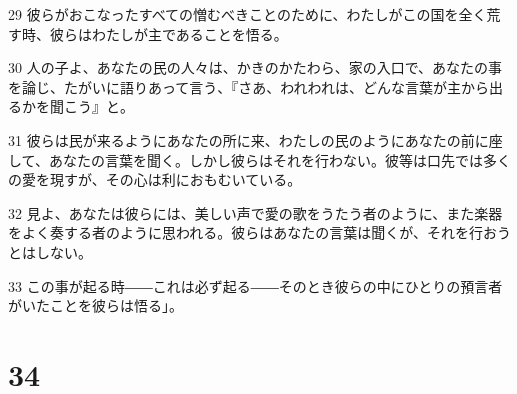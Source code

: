 \par 29 彼らがおこなったすべての憎むべきことのために、わたしがこの国を全く荒す時、彼らはわたしが主であることを悟る。
\par 30 人の子よ、あなたの民の人々は、かきのかたわら、家の入口で、あなたの事を論じ、たがいに語りあって言う、『さあ、われわれは、どんな言葉が主から出るかを聞こう』と。
\par 31 彼らは民が来るようにあなたの所に来、わたしの民のようにあなたの前に座して、あなたの言葉を聞く。しかし彼らはそれを行わない。彼等は口先では多くの愛を現すが、その心は利におもむいている。
\par 32 見よ、あなたは彼らには、美しい声で愛の歌をうたう者のように、また楽器をよく奏する者のように思われる。彼らはあなたの言葉は聞くが、それを行おうとはしない。
\par 33 この事が起る時――これは必ず起る――そのとき彼らの中にひとりの預言者がいたことを彼らは悟る」。

\chapter{34}

